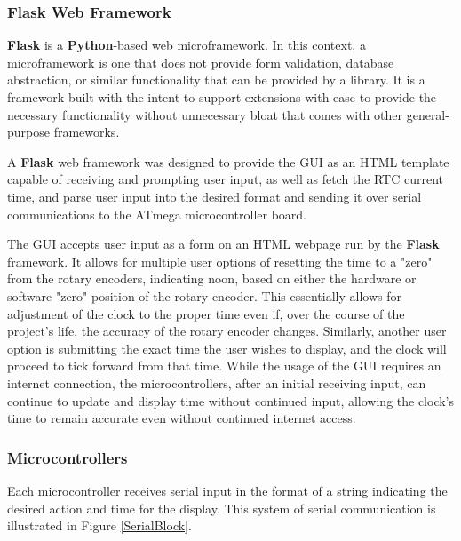 \documentclass[11pt]{article}
\begin{document}
\subsubsection{Flask Web Framework}
\label{FlaskBreakdown}


\textbf{Flask} is a \textbf{Python}-based web microframework. 
In this context, a microframework is one that does not provide form validation, database abstraction, or similar functionality that can be provided by a library. 
It is a framework built with the intent to support extensions with ease to provide the necessary functionality without unnecessary bloat that comes with other general-purpose frameworks. 

A \textbf{Flask} web framework was designed to provide the GUI as an HTML template capable of receiving and prompting user input, as well as fetch the RTC current time, and parse user input into the desired format and sending it over serial communications to the ATmega microcontroller board. 

The GUI accepts user input as a form on an HTML webpage run by the \textbf{Flask} framework. 
It allows for multiple user options of resetting the time to a "zero" from the rotary encoders, indicating noon, based on either the hardware or software "zero" position of the rotary encoder.
This essentially allows for adjustment of the clock to the proper time even if, over the course of the project's life, the accuracy of the rotary encoder changes. 
Similarly, another user option is submitting the exact time the user wishes to display, and the clock will proceed to tick forward from that time.
While the usage of the GUI requires an internet connection, the microcontrollers, after an initial receiving input, can continue to update and display time without continued input, allowing the clock's time to remain accurate even without continued internet access. 

\subsubsection{Microcontrollers}
\label{MicroBreakdown}

Each microcontroller receives serial input in the format of a string indicating the desired action and time for the display. 
This system of serial communication is illustrated in Figure \ref{SerialBlock}.
\end{document}
